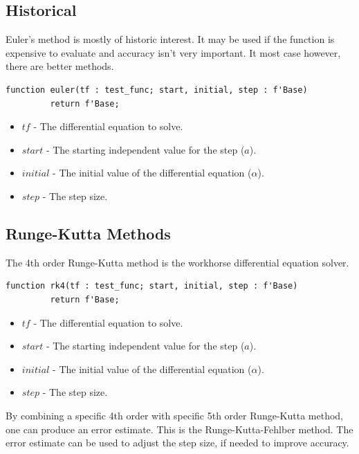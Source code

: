 \documentclass[10pt, openany]{book}
\newcommand{\indexfunc}[1]{\index[func]{#1}}
\begin{document}
\subsection{Historical}
Euler's method is mostly of historic interest.  It may be used if the function is expensive to evaluate and accuracy isn't very important.  It most case however, there are better methods.

\begin{lstlisting}
function euler(tf : test_func; start, initial, step : f'Base)
         return f'Base;
\end{lstlisting}
\indexfunc{ode-euler}
\begin{itemize}
  \item $tf$ - The differential equation to solve.
  \item $start$ - The starting independent value for the step ($a$).
  \item $initial$ - The initial value of the differential equation ($\alpha$).
  \item $step$ - The step size.
\end{itemize}

\subsection{Runge-Kutta Methods}
The 4th order Runge-Kutta method is the workhorse differential equation solver.

\begin{lstlisting}
function rk4(tf : test_func; start, initial, step : f'Base)
         return f'Base;
\end{lstlisting}
\indexfunc{ode-rk4}
\begin{itemize}
  \item $tf$ - The differential equation to solve.
  \item $start$ - The starting independent value for the step ($a$).
  \item $initial$ - The initial value of the differential equation ($\alpha$).
  \item $step$ - The step size.
\end{itemize}

By combining a specific 4th order with specific 5th order Runge-Kutta method, one can produce an error estimate.  This is the Runge-Kutta-Fehlber method.  The error estimate can be used to adjust the step size, if needed to improve accuracy.
\end{document}
